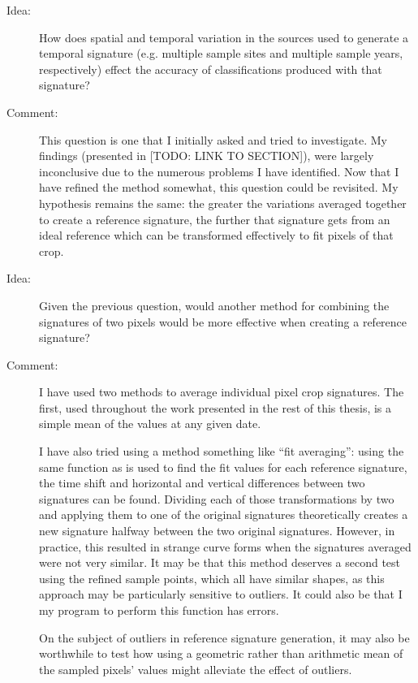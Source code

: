 \begin{description}
\item[Idea:] How does spatial and temporal variation in the sources used to generate a temporal signature (e.g. multiple sample sites and multiple sample years, respectively) effect the accuracy of classifications produced with that signature?

\item[Comment:] This question is one that I initially asked and tried to investigate. My findings (presented in [TODO: LINK TO SECTION]), were largely inconclusive due to the numerous problems I have identified. Now that I have refined the method somewhat, this question could be revisited. My hypothesis remains the same: the greater the variations averaged together to create a reference signature, the further that signature gets from an ideal reference which can be transformed effectively to fit pixels of that crop.

\item[Idea:] Given the previous question, would another method for combining the signatures of two pixels would be more effective when creating a reference signature?

\item[Comment:] I have used two methods to average individual pixel crop signatures. The first, used throughout the work presented in the rest of this thesis, is a simple mean of the values at any given date.

I have also tried using a method something like “fit averaging”: using the same function as is used to find the fit values for each reference signature, the time shift and horizontal and vertical differences between two signatures can be found. Dividing each of those transformations by two and applying them to one of the original signatures theoretically creates a new signature halfway between the two original signatures. However, in practice, this resulted in strange curve forms when the signatures averaged were not very similar. It may be that this method deserves a second test using the refined sample points, which all have similar shapes, as this approach may be particularly sensitive to outliers. It could also be that I my program to perform this function has errors.

On the subject of outliers in reference signature generation, it may also be worthwhile to test how using a geometric rather than arithmetic mean of the sampled pixels’ values might alleviate the effect of outliers.
\end{description}

